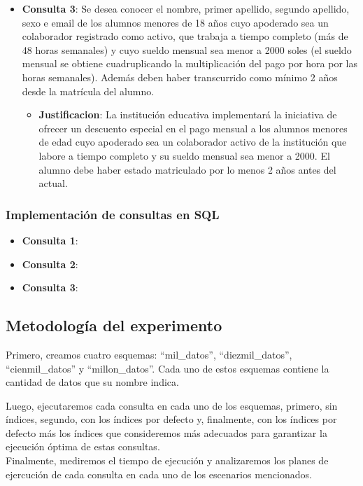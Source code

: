 \begin{itemize}
\begin{itemize}
            \end{itemize}
      \item{\textbf{Consulta 3}: Se desea conocer el nombre, primer apellido, segundo apellido, sexo e email de los alumnos menores de 18 años cuyo apoderado sea un colaborador registrado como activo, que trabaja a tiempo completo (más de 48 horas semanales) y cuyo sueldo mensual sea menor a 2000 soles (el sueldo mensual se obtiene cuadruplicando la multiplicación del pago por hora por las horas semanales). Además deben haber transcurrido como mínimo 2 años desde la matrícula del alumno.}
            \begin{itemize}
                  \item{\textbf{Justificacion}: La institución educativa implementará la iniciativa de ofrecer un descuento especial en el pago mensual a los alumnos menores de edad cuyo apoderado sea un colaborador activo de la institución que labore a tiempo completo y su sueldo mensual sea menor a 2000. El alumno debe haber estado matriculado por lo menos 2 años antes del actual.}
            \end{itemize}
\end{itemize}
\subsubsection{Implementación de consultas en SQL}
\begin{itemize}
      \item{\textbf{Consulta 1}:
            }
      \item{\textbf{Consulta 2}:
            }
      \item{\textbf{Consulta 3}:
            }
\end{itemize}
\subsection{Metodología del experimento}
\begin{sloppypar}
      Primero, creamos cuatro esquemas: ``mil\_datos'', ``diezmil\_datos'', ``cienmil\_datos'' y ``millon\_datos''. Cada uno de estos esquemas contiene la cantidad de datos que su nombre indica.
\end{sloppypar}

Luego, ejecutaremos cada consulta en cada uno de los esquemas, primero, sin índices, segundo, con los índices por defecto y, finalmente, con los índices por defecto más los índices que consideremos más adecuados para garantizar la ejecución óptima de estas consultas.\\
Finalmente, mediremos el tiempo de ejecución y analizaremos los planes de ejercución de cada consulta en cada uno de los escenarios mencionados.
